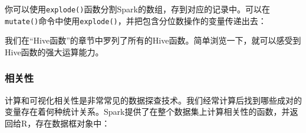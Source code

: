 \documentclass[
]{article}
\newenvironment{Shaded}{\begin{snugshade}}{\end{snugshade}}
\newcommand{\CommentTok}[1]{\textcolor[rgb]{0.56,0.35,0.01}{\textit{#1}}}
\newcommand{\DataTypeTok}[1]{\textcolor[rgb]{0.13,0.29,0.53}{#1}}
\newcommand{\DecValTok}[1]{\textcolor[rgb]{0.00,0.00,0.81}{#1}}
\newcommand{\FloatTok}[1]{\textcolor[rgb]{0.00,0.00,0.81}{#1}}
\newcommand{\KeywordTok}[1]{\textcolor[rgb]{0.13,0.29,0.53}{\textbf{#1}}}
\newcommand{\NormalTok}[1]{#1}
\newcommand{\OperatorTok}[1]{\textcolor[rgb]{0.81,0.36,0.00}{\textbf{#1}}}
\newcommand{\StringTok}[1]{\textcolor[rgb]{0.31,0.60,0.02}{#1}}
\begin{document}
你可以使用\texttt{explode()}函数分割Spark的数组，存到对应的记录中。可以在\texttt{mutate()}命令中使用\texttt{explode()}，并把包含分位数操作的变量传递出去：

\begin{Shaded}
\end{Shaded}

我们在``Hive函数''的章节中罗列了所有的Hive函数。简单浏览一下，就可以感受到Hive函数的强大运算能力。

\hypertarget{ux76f8ux5173ux6027}{%
\subsubsection{相关性}\label{ux76f8ux5173ux6027}}

计算和可视化相关性是非常常见的数据探查技术。我们经常计算后找到哪些成对的变量存在着何种统计关系。Spark提供了在整个数据集上计算相关性的函数，并返回给R，存在数据框对象中：
\end{document}

